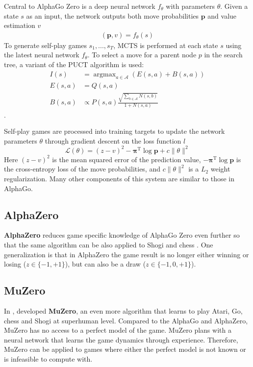 Central to AlphaGo Zero is a deep neural network $f_\theta$ with parameters $\theta$.
Given a state $s$ as an input, the network outputs both move probabilities $\pmb{p}$ and value estimation $v$
\begin{align*}
    (\mathbf{p}, v) = f_\theta(s)
\end{align*}
To generate self-play games $s_1, ..., s_T$, MCTS is performed at each state $s$ using the latest neural network $f_\theta$.
To select a move for a parent node $p$ in the search tree, a variant of the PUCT algorithm is used:
\begin{align*}
    I(s)     & = \operatorname{argmax}_{a \in \mathcal{A}} \left( E(s, a) + B(s, a) \right)  \\
    E(s, a)  & = Q(s, a)  \\
    B(s, a)  & \propto P(s, a) \frac{\sqrt{\sum_{b \in \mathcal{A}}{N(s, b)}}}{1+N(s, a)}
\end{align*} \label{sec:puct}.

Self-play games are processed into training targets to update the network parameters $\theta$ through gradient descent on the loss function $l$
\begin{equation*}
    \mathcal{L}(\theta) = (z-v)^{2} - \pmb{\pi}^{\mathrm{T}} \log \pmb{p}+c\|\theta\|^{2}
\end{equation*}
Here $(z-v)^2$ is the mean squared error of the prediction value,
$-\pmb{\pi}^{\mathrm{T}} \log \pmb{p}$ is the cross-entropy loss of the move probabilities,
and $c\|\theta\|^2$ is a $L_2$ weight regularization.
Many other components of this system are similar to those in AlphaGo.

\subsection{AlphaZero}
\textbf{AlphaZero} reduces game specific knowledge of AlphaGo Zero even further so that the same algorithm can be also applied to Shogi and chess
\cite{MasteringChessShogi_Silver.Hubert.ea_2017}.
One generalization is that in AlphaZero the game result is no longer either winning or losing ($z \in \{ -1, +1 \}$), but can also be a draw ($z \in \{-1, 0, +1 \}$).

\subsection{MuZero} \label{sec:muzero}
In \citeyear{MasteringAtariGo_Schrittwieser.Antonoglou.ea_2020},
\citeauthor{MasteringAtariGo_Schrittwieser.Antonoglou.ea_2020} developed
\textbf{MuZero}, an even more algorithm that learns to play Atari, Go, chess and Shogi at superhuman level.
Compared to the AlphaGo and AlphaZero,
MuZero has no access to a perfect model of the game.
MuZero plans with a neural network that learns the game dynamics through experience.
Therefore, MuZero can be applied to games where either the perfect model is not known or is infeasible to compute with.

